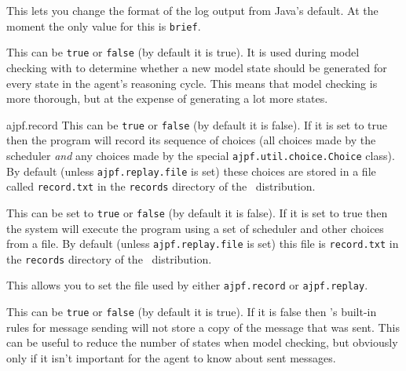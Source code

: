 \begin{description}
\item[log.format] This lets you change the format of the log output from Java's default.  At the moment the only value for this is \texttt{brief}.
\item[ajpf.transition\_every\_reasoning\_cycle] This can be \texttt{true} or \texttt{false} (by default it is true).  It is used during model checking with \ajpf{} to determine whether a new model state should be generated for every state in the agent's reasoning cycle.  This means that model checking is more thorough, but at the expense of generating a lot more states.
\begin{sloppypar}
\item[ajpf.record] This can be \texttt{true} or \texttt{false} (by default  it is false).  If it is set to true then the program will record its sequence of choices (all choices made by the scheduler \emph{and} any choices made by the special \texttt{ajpf.util.choice.Choice} class).  By default (unless \texttt{ajpf.replay.file} is set) these choices are stored in a file called \texttt{record.txt} in the \texttt{records} directory of the \mcapl\ distribution.
\end{sloppypar}
\item[ajpf.replay] This can be set to \texttt{true} or \texttt{false} (by default it is false).  If it is set to true then the system will execute the program using a set of scheduler and other choices from a file.  By default (unless \texttt{ajpf.replay.file} is set) this  file is  \texttt{record.txt} in the \texttt{records} directory of the \mcapl\ distribution.
\item[ajpf.replay.file] This allows you to set the file used by either \texttt{ajpf.record} or \texttt{ajpf.replay}.
\item[ail.store\_sent\_messages]  This can be \texttt{true} or \texttt{false} (by default it is true).  If it is false then \ail{}'s built-in rules for message sending will not store a copy of the message that was sent.  This can be useful to reduce the number of states when model checking, but obviously only if it isn't important for the agent to know about sent messages.
\end{description}

